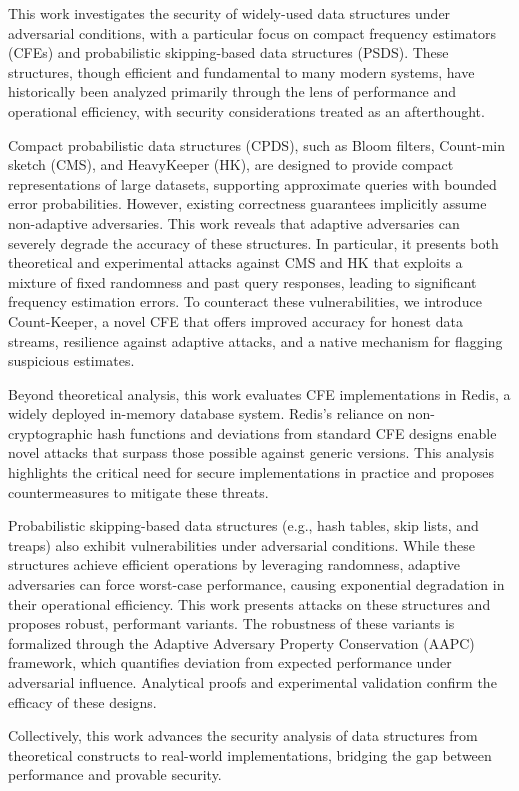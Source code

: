 

This work investigates the security of widely-used data structures under adversarial conditions, with a particular focus on compact frequency estimators (CFEs) and probabilistic skipping-based data structures (PSDS). These structures, though efficient and fundamental to many modern systems, have historically been analyzed primarily through the lens of performance and operational efficiency, with security considerations treated as an afterthought.

Compact probabilistic data structures (CPDS), such as Bloom filters, Count-min sketch (CMS), and HeavyKeeper (HK), are designed to provide compact representations of large datasets, supporting approximate queries with bounded error probabilities. However, existing correctness guarantees implicitly assume non-adaptive adversaries. This work reveals that adaptive adversaries can severely degrade the accuracy of these structures. In particular, it presents both theoretical and experimental attacks against CMS and HK that exploits a mixture of fixed randomness and past query responses, leading to significant frequency estimation errors. To counteract these vulnerabilities, we introduce Count-Keeper, a novel CFE that offers improved accuracy for honest data streams, resilience against adaptive attacks, and a native mechanism for flagging suspicious estimates.

Beyond theoretical analysis, this work evaluates CFE implementations in Redis, a widely deployed in-memory database system. Redis's reliance on non-cryptographic hash functions and deviations from standard CFE designs enable novel attacks that surpass those possible against generic versions. This analysis highlights the critical need for secure implementations in practice and proposes countermeasures to mitigate these threats.

Probabilistic skipping-based data structures (e.g., hash tables, skip lists, and treaps) also exhibit vulnerabilities under adversarial conditions. While these structures achieve efficient operations by leveraging randomness, adaptive adversaries can force worst-case performance, causing exponential degradation in their operational efficiency. This work presents attacks on these structures and proposes robust, performant variants. The robustness of these variants is formalized through the Adaptive Adversary Property Conservation (AAPC) framework, which quantifies deviation from expected performance under adversarial influence. Analytical proofs and experimental validation confirm the efficacy of these designs.

Collectively, this work advances the security analysis of data structures from theoretical constructs to real-world implementations, bridging the gap between performance and provable security. 